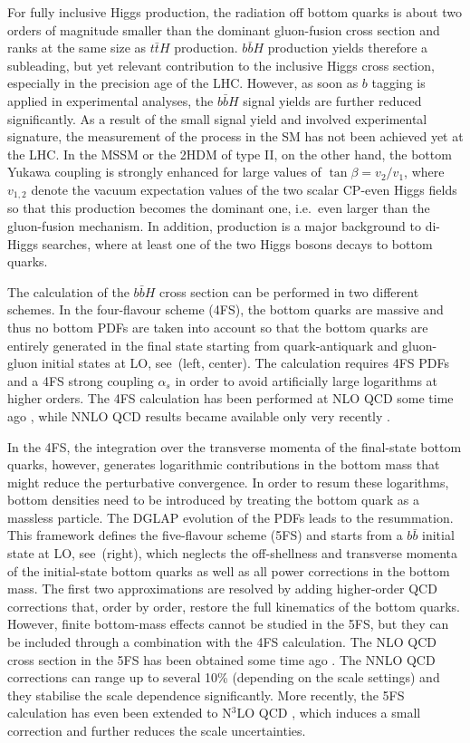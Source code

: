 \documentclass[11pt,a4paper]{article}
\begin{document}
For fully inclusive Higgs production, the radiation off bottom quarks is about two orders of magnitude smaller than the dominant gluon-fusion cross section and ranks at the same size as $t\bar tH$ production. $b\bar bH$ production yields therefore a subleading, but yet relevant 
contribution to the inclusive Higgs cross section, especially in the precision age of the LHC. However, as soon as $b$ tagging is applied 
in experimental analyses, the $b\bar bH$ signal yields are further reduced significantly. 
As a result of the small signal yield and involved experimental signature,
the measurement of the \bbH{} process in the 
SM has not been achieved yet at the LHC. In the MSSM or the 2HDM of type II, on the other hand, the bottom Yukawa coupling is strongly enhanced for large values of $\tan\beta = v_2/v_1$, where $v_{1,2}$ denote the vacuum expectation values of the two scalar CP-even Higgs fields so that this production becomes the
dominant one, i.e.\ even larger than the gluon-fusion mechanism. In addition, \bbH{} production is a major background to di-Higgs searches, where at least 
one of the two Higgs bosons decays to bottom quarks.

The calculation of the $b\bar bH$ cross section can be performed in two different schemes. In the four-flavour scheme (4FS), the bottom quarks are massive and thus no bottom PDFs are taken into account so that the bottom quarks are entirely generated in the final state starting from quark-antiquark and gluon-gluon initial states at LO, see \,(left, center). The calculation requires 4FS PDFs and a 4FS strong coupling $\alpha_s$ in order to avoid artificially large logarithms at higher orders. The 4FS calculation has been performed at NLO QCD some time ago \cite{dittmaier:2003ej,dawson:2003kb}, while NNLO QCD results became available only very recently \cite{Biello:2024pgo}.

In the 4FS, the integration over the transverse momenta of the final-state bottom quarks, however, generates logarithmic contributions in the 
bottom mass that might reduce the perturbative convergence. In order to resum these logarithms, bottom densities need to be introduced by
treating the bottom quark as a massless particle. The DGLAP evolution of the PDFs leads to the resummation. This framework defines the five-flavour scheme (5FS) and starts from a $b\bar b$ initial state at LO, see \,(right), which neglects the off-shellness and transverse momenta of the initial-state bottom quarks
as well as all power corrections in the bottom mass. The first two approximations are resolved by adding higher-order QCD corrections that, order by order, restore the full kinematics of the bottom quarks. However, finite bottom-mass effects cannot be studied in the 5FS, but they can be included
through a combination with the 4FS calculation. The NLO QCD cross section in the 5FS has been obtained some time 
ago \cite{dicus:1998hs,balazs:1998bm}. The NNLO QCD corrections \cite{harlander_2003} can range up to several 10\% (depending on the scale settings)
and they stabilise the scale dependence significantly. More recently, the 5FS calculation has even been extended to N$^3$LO QCD \cite{duhr:2019kwi}, which 
induces a small correction and further reduces the scale uncertainties.
\end{document}
